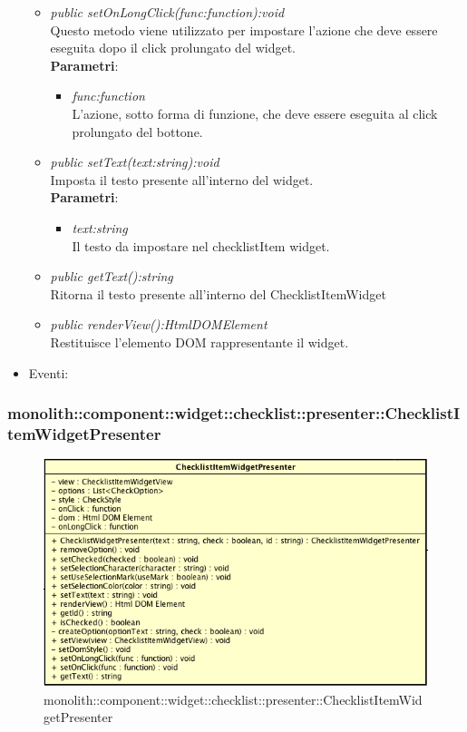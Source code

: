 \begin{itemize}
\begin{itemize}
	\item \textit{public setOnLongClick(func:function):void}\\
		Questo metodo viene utilizzato per impostare l'azione che deve essere eseguita dopo il click prolungato del widget.
		\\ \textbf{Parametri}: \begin{itemize}
		\item \textit{func:function}\\
		L'azione, sotto forma di funzione, che deve essere eseguita al click prolungato del bottone.
		\end{itemize}
	\item \textit{public setText(text:string):void}\\
	Imposta il testo presente all'interno del widget.
		\\ \textbf{Parametri}: \begin{itemize}
		\item \textit{text:string}\\
		Il testo da impostare nel checklistItem widget.
		\end{itemize}
	\item \textit{public getText():string}\\
	Ritorna il testo presente all'interno del ChecklistItemWidget
	\item \textit{public renderView():HtmlDOMElement}\\
	Restituisce l'elemento DOM rappresentante il widget.
	\end{itemize}
\item{Eventi}:
\end{itemize}

\subsubsection{monolith::component::widget::checklist::presenter::ChecklistItemWidgetPresenter}

\label{monolith::component::widget::checklist::presenter::ChecklistItemWidgetPresenter}
\begin{figure}[H]
	\centering
	\includegraphics[scale=0.5]{Sezioni/SottosezioniST/img/ChecklistItemWidgetPresenter.png}
	\caption{monolith::component::widget::checklist::presenter::ChecklistItemWidgetPresenter}
\end{figure}

